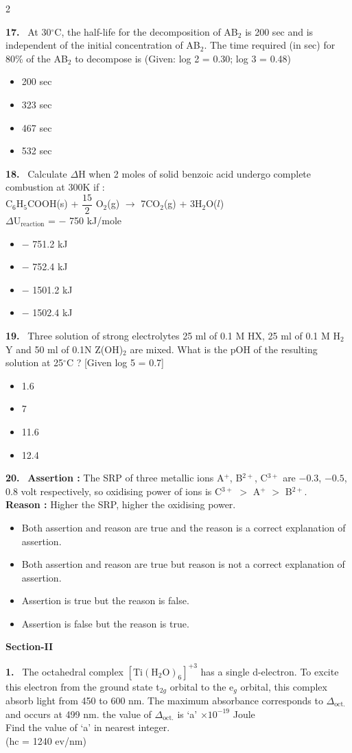 \documentclass[10pt]{extarticle}
\newcommand{\sect}[1]{\par\smallskip\noindent\textbf{#1}\par}
\newcommand{\qn}[1]{\par\smallskip\noindent\textbf{#1.}~}
\newenvironment{qoptions}{\begin{itemize}[leftmargin=1.8em,itemsep=1pt,topsep=2pt,label={}]}{\end{itemize}}
\newcommand{\opt}[2]{\item[(#1)] #2}
\begin{document}
\begin{multicols}{2}
\qn{17} At 30$^\circ$C, the half-life for the decomposition of AB$_2$ is 200 sec and is independent of the initial concentration of AB$_2$. The time required (in sec) for 80\% of the AB$_2$ to decompose is (Given: log 2 = 0.30; log 3 = 0.48)
\begin{qoptions}
\opt{A}{200 sec}
\opt{B}{323 sec}
\opt{C}{467 sec}
\opt{D}{532 sec}
\end{qoptions}

\qn{18} Calculate $\Delta$H when 2 moles of solid benzoic acid undergo complete combustion at 300K if :\\
C$_6$H$_5$COOH(s) + $\dfrac{15}2$ O$_2$(g) $\longrightarrow$ 7CO$_2$(g) + 3H$_2$O($l$)\\
$\Delta$U$_{\text{reaction}}$ = $-$ 750 kJ/mole\\
\relax[R = 8 Joule/ mole-K]
\begin{qoptions}
\opt{A}{$-$ 751.2 kJ}
\opt{B}{$-$ 752.4 kJ}
\opt{C}{$-$ 1501.2 kJ}
\opt{D}{$-$ 1502.4 kJ}
\end{qoptions}

\qn{19} Three solution of strong electrolytes 25 ml of 0.1 M HX, 25 ml of 0.1 M H$_2$Y and 50 ml of 0.1N Z(OH)$_2$ are mixed. What is the pOH of the resulting solution at 25$^\circ$C ? [Given log 5 = 0.7]
\begin{qoptions}
\opt{A}{1.6}
\opt{B}{7}
\opt{C}{11.6}
\opt{D}{12.4}
\end{qoptions}

\qn{20} \textbf{Assertion :} The SRP of three metallic ions A$^{+}$, B$^{2+}$, C$^{3+}$ are $-0.3$, $-0.5$, 0.8 volt respectively, so oxidising power of ions is C$^{3+}$ $>$ A$^{+}$ $>$ B$^{2+}$.\\
\textbf{Reason :} Higher the SRP, higher the oxidising power.
\begin{qoptions}
\opt{A}{Both assertion and reason are true and the reason is a correct explanation of assertion.}
\opt{B}{Both assertion and reason are true but reason is not a correct explanation of assertion.}
\opt{C}{Assertion is true but the reason is false.}
\opt{D}{Assertion is false but the reason is true.}
\end{qoptions}

\sect{Section-II}

\qn{1} The octahedral complex $[\mathrm{Ti(H_2O)_6}]^{+3}$ has a single d-electron. To excite this electron from the ground state t$_{2g}$ orbital to the e$_g$ orbital, this complex absorb light from 450 to 600 nm. The maximum absorbance corresponds to $\Delta_{\text{oct.}}$ and occurs at 499 nm. the value of $\Delta_{\text{oct.}}$ is `a' $\times10^{-19}$ Joule\\
Find the value of `a' in nearest integer.\\
(hc = 1240 ev/nm)


\end{multicols}
\end{document}
